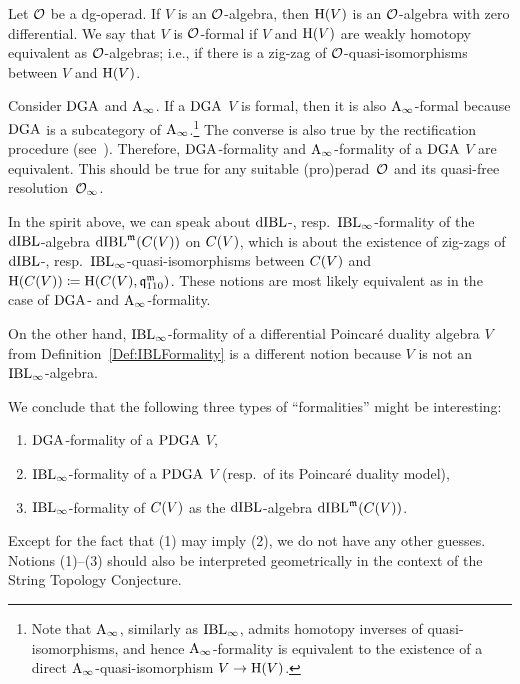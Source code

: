 \documentclass[\MainFolder/Text.tex]{subfiles}
\begin{document}
\begin{Remark}\label{Rem:Intfor}
Let $\mathcal{O}$ be a dg-operad. If $V$ is an $\mathcal{O}$-algebra, then $\mathrm{H}(V)$ is an $\mathcal{O}$-algebra with zero differential. We say that $V$ is $\mathcal{O}$-formal if $V$ and $\mathrm{H}(V)$ are weakly homotopy equivalent as $\mathcal{O}$-algebras; i.e., if there is a zig-zag of $\mathcal{O}$-quasi-isomorphisms between $V$ and $\mathrm{H}(V)$.

Consider $\mathrm{DGA}$ and $\mathrm{A}_\infty$. If a $\mathrm{DGA}$ $V$ is formal, then it is also $\mathrm{A}_\infty$-formal because $\mathrm{DGA}$ is a subcategory of $\mathrm{A}_\infty$.\footnote{Note that $\mathrm{A}_\infty$, similarly as $\mathrm{IBL}_\infty$, admits homotopy inverses of quasi-isomorphisms, and hence $\mathrm{A}_\infty$-formality is equivalent to the existence of a direct $\mathrm{A}_\infty$-quasi-isomorphism $V \rightarrow \mathrm{H}(V)$.} The converse is also true by the rectification procedure (see~\cite{MSE2719961}). Therefore, $\mathrm{DGA}$-formality and $\mathrm{A}_\infty$-formality of a $\mathrm{DGA}$ $V$ are equivalent. This should be true for any suitable (pro)perad~$\mathcal{O}$ and its quasi-free resolution~$\mathcal{O}_\infty$.

In the spirit above, we can speak about $\mathrm{dIBL}$-, resp.~$\mathrm{IBL}_\infty$-formality of the $\mathrm{dIBL}$-algebra $\mathrm{dIBL}^{\mathfrak{m}}(C(V))$ on $C(V)$, which is about the existence of zig-zags of $\mathrm{dIBL}$-, resp.~$\mathrm{IBL}_\infty$-quasi-isomorphisms between $C(V)$ and $\mathrm{H}(C(V))\coloneqq\mathrm{H}(C(V),\mathfrak{q}_{110}^{\mathfrak{m}})$. These notions are most likely equivalent as in the case of $\mathrm{DGA}$- and $\mathrm{A}_\infty$-formality.

On the other hand, $\mathrm{IBL}_\infty$-formality of a differential Poincar\'e duality algebra $V$ from Definition~\ref{Def:IBLFormality} is a different notion because $V$ is not an $\mathrm{IBL}_\infty$-algebra.

We conclude that the following three types of ``formalities'' might be interesting: 
\begin{enumerate}[label=\arabic*)]
 \item $\mathrm{DGA}$-formality of a $\mathrm{PDGA}$ $V$, 
 \item $\mathrm{IBL}_\infty$-formality of a $\mathrm{PDGA}$ $V$ (resp.~of its Poincar\'e duality model),
 \item $\mathrm{IBL}_\infty$-formality of $C(V)$ as the $\mathrm{dIBL}$-algebra $\mathrm{dIBL}^{\mathfrak{m}}(C(V))$.
\end{enumerate}
Except for the fact that (1) may imply (2), we do not have any other guesses. Notions (1)--(3) should also be interpreted geometrically in the context of the String Topology Conjecture.
\end{Remark}
\end{document}
